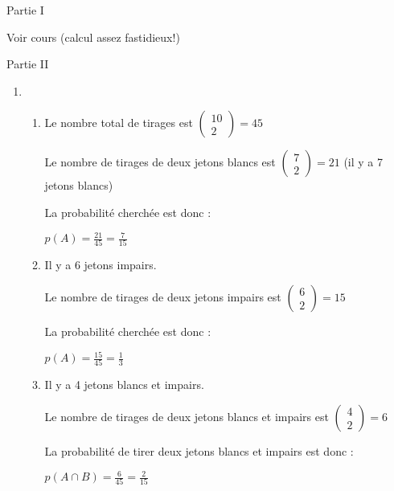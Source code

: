\begin{corrige}
     \begin{h3}Partie I\end{h3}
     Voir cours (calcul assez fastidieux!)
     \begin{h3}Partie II\end{h3}
     \begin{enumerate}
          \item
          \begin{enumerate}[label=\alph*.]
               \item
               Le nombre total de tirages est $\begin{pmatrix} 10 \\ 2 \end{pmatrix}=45$
               \par
               Le nombre de tirages de deux jetons blancs est $\begin{pmatrix} 7 \\ 2 \end{pmatrix}=21$ (il y a 7 jetons blancs)
               \par
               La probabilité cherchée est donc :
               \par
               $p\left(A\right)=\frac{21}{45}=\frac{7}{15}$
               \item
               Il y a 6 jetons impairs.
               \par
               Le nombre de tirages de deux jetons impairs est $\begin{pmatrix} 6 \\ 2 \end{pmatrix}=15$
               \par
               La probabilité cherchée est donc :
               \par
               $p\left(A\right)=\frac{15}{45}=\frac{1}{3}$
               \item
               Il y a 4 jetons blancs et impairs.
               \par
               Le nombre de tirages de deux jetons blancs et impairs est $\begin{pmatrix} 4 \\ 2 \end{pmatrix}=6$
               \par
               La probabilité de tirer deux jetons blancs et impairs est donc :
               \par
               $p\left(A \cap  B\right)=\frac{6}{45}=\frac{2}{15}$

\end{enumerate}
\end{enumerate}
\end{corrige}
